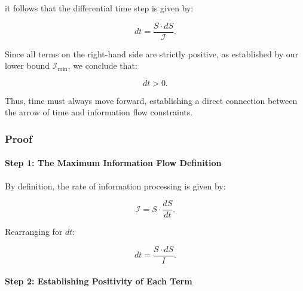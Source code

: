 \documentclass[12pt]{article}
\begin{document}
it follows that the differential time step is given by:

\begin{equation}
    dt = \frac{S \cdot dS}{\mathcal{I}}.
\end{equation}

Since all terms on the right-hand side are strictly positive, as established by our lower bound $\mathcal{I}_{\min}$, we conclude that:

\begin{equation}
    dt > 0.
\end{equation}

Thus, time must always move forward, establishing a direct connection between the arrow of time and information flow constraints.

\subsubsection{Proof}

\paragraph{Step 1: The Maximum Information Flow Definition}
By definition, the rate of information processing is given by:

\begin{equation}
    \mathcal{I} = S \cdot \frac{dS}{dt}.
\end{equation}

Rearranging for \( dt \):

\begin{equation}
    dt = \frac{S \cdot dS}{I}.
\end{equation}

\paragraph{Step 2: Establishing Positivity of Each Term}
\end{document}
